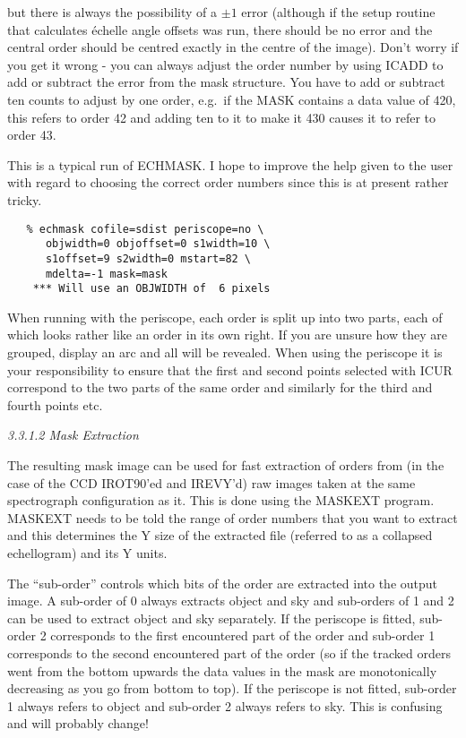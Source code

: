 but there is always the possibility of a $\pm 1$ error (although if the
setup routine that calculates \'echelle angle offsets was run, there
should be no error and the central order should be centred exactly in
the centre of the image).  Don't worry if you get it wrong - you can
always adjust the order number by using ICADD to add or subtract the
error from the mask structure. You have to add or subtract ten counts to
adjust by one order, e.g.\ if the MASK contains a data value of 420, this
refers to order 42 and adding ten to it to make it 430 causes it to
refer to order 43.

This is a typical run of ECHMASK. I hope to improve the help given to the
user with regard to choosing the correct order numbers since this is at present
rather tricky.

\begin{verbatim}
   % echmask cofile=sdist periscope=no \
      objwidth=0 objoffset=0 s1width=10 \
      s1offset=9 s2width=0 mstart=82 \
      mdelta=-1 mask=mask
    *** Will use an OBJWIDTH of  6 pixels
\end{verbatim}

When running with the periscope, each order is split up into two parts,
each of which looks rather like an order in its own right. If you are unsure
how they are grouped, display an arc and all will be revealed. When using
the periscope it is your responsibility to ensure that the first and second
points selected with ICUR correspond to the two parts of the same order
and similarly for the third and fourth points etc.


\goodbreak
\vspace{12pt}
{\it 3.3.1.2 Mask Extraction}

The resulting mask image can be used for fast extraction of orders from (in the
case of the CCD IROT90'ed and IREVY'd) raw images taken at the same
spectrograph configuration as it. This is done using the MASKEXT program.
MASKEXT needs to be told the range of order numbers that you want to extract
and this determines the Y size of the extracted file (referred to as a
collapsed echellogram) and its Y units.

The ``sub-order'' controls which bits of the
order are extracted into the output
image. A sub-order of 0 always extracts object and sky and sub-orders of 1 and
2 can be used to extract object and sky separately. If the periscope is fitted,
sub-order 2 corresponds to the first encountered part of the order and
sub-order 1 corresponds to the second encountered part of the order (so if the
tracked orders went from the bottom upwards the data values in the mask are
monotonically decreasing as you go from bottom to top). If the periscope is not
fitted, sub-order 1 always refers to object and sub-order 2 always refers to
sky. This is confusing and will probably change!

